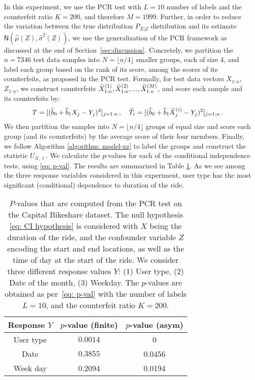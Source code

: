 \documentclass[11pt]{article}
\def\normal{\mathsf{N}}
\begin{document}
In this experiment, we use the PCR test with $L=10$ number of labels and the counterfeit ratio $K=200$, and therefore $M=1999$. Further, in order to reduce the variation between the true distribution $P_{X|Z}$ distribution and its estimate  $\normal(\widehat{\mu}(Z), \widehat{\sigma}^2(Z))$, we use the generalization of the PCR framework as discussed at the end of Section~\ref{sec:discussion}. Concretely, we partition the $n=7346$ test data samples into $N= \lfloor n/4 \rfloor$ smaller groups, each of size $4$, and label each group based on the rank of its score, among the scores of its counterfeits, as proposed in the PCR test.  Formally, for test data vectors $X_{1:n}$, $Z_{1:n}$, we construct counterfeits ${\widetilde{X}}_{1:n}^{(1)},{\widetilde{X}}_{1:n}^{(2)},...,{\widetilde{X}}_{1:n}^{(M)}$, and score each sample and its counterfeits by:
\[
T=[(\widehat{b}_0+\widehat{b}_1X_j-Y_j)^2]_{j=1:n}\,, \quad \widetilde{T}_i=[(\widehat{b}_0+\widehat{b}_1{\widetilde{X}}_j^{(i)}-Y_j)^2]_{j=1:n}\,.
\]
We then partition the samples into $N=\lfloor n/4 \rfloor$ groups of equal size and score each group (and its counterfeits) by the average score of their four members. Finally, we follow Algorithm \eqref{algorithm: model-xz} to label the groups and construct the statistic $U_{N,\ell}$. We calculate the $p$-values for each of the conditional independence tests, using \eqref{eq: p-val}. The results are summarized in Table \ref{table: real-data}. As we see among the three response variables considered in this experiment, user type has the most significant (conditional) dependence to duration of the ride.
\begin{table}
\begin{center}
\begin{tabular}{|c|c|c|}
\hline
Response $Y$ & $p$-value (finite) &$p$-value (asym)\\ \hline 
User type &   $0.0014$ & 0   \\ \hline
Date & $0.3855$ & 0.0456 \\ \hline
Week day &  0.2094 & 0.0194  \\ \hline
\end{tabular}
\caption{$P$-values that are computed from the PCR test on the Capital Bikeshare dataset. The null hypothesis \eqref{eq: CI hypothesis} is considered with $X$ being the duration of the ride, and the confounder variable $Z$ encoding the start and end locations, as well as the time of day at the start of the ride. We consider three different response values $Y$: (1) User type, (2) Date of the month, (3) Weekday. The $p$-values are obtained as per~\eqref{eq: p-val} with the number of labels $L=10$, and the counterfeit ratio $K=200$.}\label{table: real-data}
\end{center}
\end{table}
\end{document}
